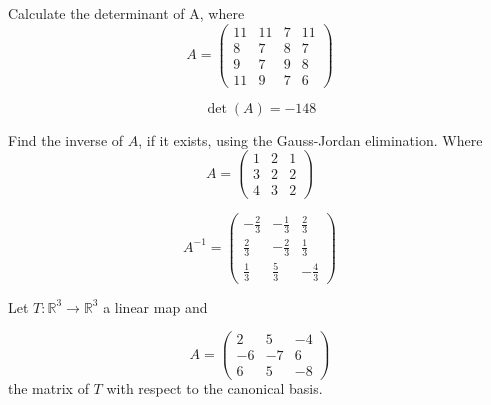 \begin{questions}

\question Calculate the determinant of A, where
$$
A=\left(\begin{array}{rrrr}
11 & 11 & 7 & 11 \\
8 & 7 & 8 & 7 \\
9 & 7 & 9 & 8 \\
11 & 9 & 7 & 6
\end{array}\right)
$$

\begin{solution}
$$\det(A)=-148$$
\end{solution}

\question Find the inverse of $A$, if it exists, using the Gauss-Jordan elimination. Where
$$
A=\left(\begin{array}{rrr}
1 & 2 & 1 \\
3 & 2 & 2 \\
4 & 3 & 2
\end{array}\right)
$$

\begin{solution}
$$A^{-1}=\left(\begin{array}{rrr}
-\frac{2}{3} & -\frac{1}{3} & \frac{2}{3} \\
\frac{2}{3} & -\frac{2}{3} & \frac{1}{3} \\
\frac{1}{3} & \frac{5}{3} & -\frac{4}{3}
\end{array}\right)$$
\end{solution}

\question Let $T:\mathbb{R}^3\rightarrow\mathbb{R}^3$  a linear map and
 
$$
A=\left(\begin{array}{rrr}
2 & 5 & -4 \\
-6 & -7 & 6 \\
6 & 5 & -8
\end{array}\right)
$$
the matrix of $T$ with respect to the canonical basis.
\end{questions}
